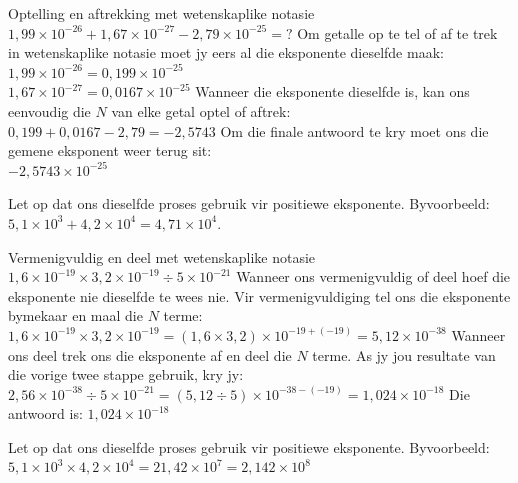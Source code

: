 \begin{wex}{Optelling en aftrekking met wetenskaplike notasie}
 {$1,99 \times 10^{-26} + 1,67 \times 10^{-27} - 2,79 \times 10^{-25} = ?$}
{
Om getalle op te tel of af te trek in wetenskaplike notasie moet jy eers al die eksponente dieselfde maak: \\
$1,99 \times 10^{-26} = 0,199 \times 10^{-25}$ \\
$1,67 \times 10^{-27} = 0,0167 \times 10^{-25}$
Wanneer die eksponente dieselfde is, kan ons eenvoudig die $N$ van elke getal optel of aftrek:\\
$0,199 + 0,0167 - 2,79 = -2,5743$ 
Om die finale antwoord te kry moet ons die gemene eksponent weer terug sit:\\
$-2,5743 \times 10^{-25}$
}
\end{wex}
Let op dat ons dieselfde proses gebruik vir positiewe eksponente. Byvoorbeeld: $5,1 \times 10^{3} + 4,2 \times 10^{4} = 4,71 \times 10^{4}$. 
\begin{wex}{Vermenigvuldig en deel met wetenskaplike notasie}
 {$1,6 \times 10^{-19} \times 3,2 \times 10^{-19} \div 5 \times 10^{-21} $}
{ 
Wanneer ons vermenigvuldig of deel hoef die eksponente nie dieselfde te wees nie. Vir vermenigvuldiging tel ons die eksponente bymekaar en maal die $N$ terme:\\
$1,6 \times 10^{-19} \times 3,2 \times 10^{-19} = (1,6 \times 3,2) \times 10^{-19 + (-19)} = 5,12 \times 10^{-38}$
Wanneer ons deel trek ons die eksponente af en deel die $N$ terme. As jy jou resultate van die vorige twee stappe gebruik, kry jy:\\
$2,56 \times 10^{-38} \div 5 \times 10^{-21} = (5,12 \div 5) \times 10^{-38 - (-19)} = 1,024 \times 10^{-18}$
Die antwoord is: $1,024 \times 10^{-18}$
}
\end{wex}
Let op dat ons dieselfde proses gebruik vir positiewe eksponente. Byvoorbeeld: $5,1 \times 10^{3} \times 4,2 \times 10^{4} = 21,42 \times 10^{7} = 2,142 \times 10^{8}$
